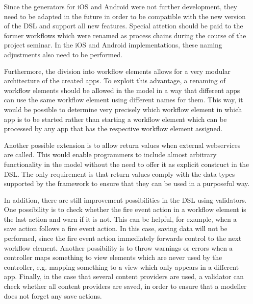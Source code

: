 

Since the generators for iOS and Android were not further development, they need to be adapted in the future in order to be compatible with the new version of the DSL and support all new features. Special attetion should be paid to the former workflows which were renamed as process chains during the course of the project seminar. In the iOS and Android implementations, these naming adjustments also need to be performed.

Furthermore, the division into workflow elements allows for a very modular architecture of the created apps. To exploit this advantage, a renaming of workflow elements should be allowed in the model in a way that different apps can use the same workflow element using different names for them. This way, it would be possible to determine very precisely which workflow element in which app is to be started rather than starting a workflow element which can be processed by any app that has the respective workflow element assigned.

Another possible extension is to allow return values when external webservices are called. This would enable programmers to include almost arbitrary functionality in the model without the need to offer it as explicit construct in the DSL. The only requirement is that return values comply with the data types supported by the \MD framework to ensure that they can be used in a purposeful way.

In addition, there are still improvement possibilities in the DSL using validators. One possibility is to check whether the fire event action in a workflow element is the last action and warn if it is not. This can be helpful, for example, when a save action follows a fire event action. In this case, saving data will not be performed, since the fire event action immediately forwards control to the next workflow element. Another possibility is to throw warnings or errors when a controller maps something to view elements which are never used by the controller, e.g. mapping something to a view which only appears in a different app. Finally, in the case that several content providers are used, a validator can check whether all content providers are saved, in order to ensure that a modeller does not forget any save actions.